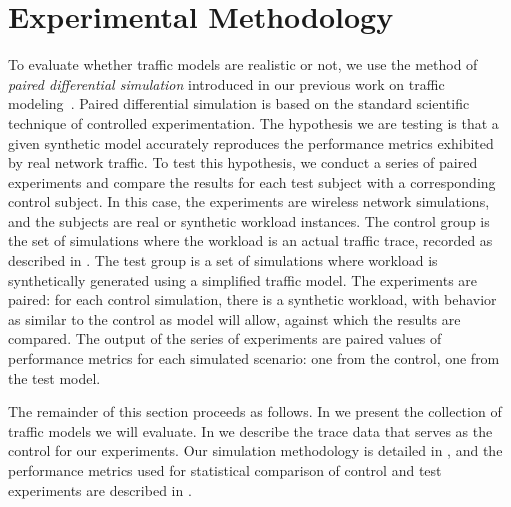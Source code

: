 \documentclass[twocolumn,final]{svjour3}
\begin{document}



\section{Experimental Methodology}
\label{sec:methodology}

To evaluate whether traffic models are realistic or not, we use the method of \textit{paired differential simulation} introduced in our previous work on traffic modeling~\cite{Karpinski07:realism,Karpinski07:cbr-failure}. %
%
%
Paired differential simulation is based on the standard scientific technique of controlled experimentation. 
The hypothesis we are testing is that a given synthetic model accurately reproduces the performance metrics exhibited by real network traffic. To test this hypothesis, we conduct a series of paired experiments and compare the results for each test subject with a corresponding control subject. In this case, the experiments are wireless network simulations, and the subjects are real or synthetic workload instances. The control group is the set of simulations where the workload is an actual traffic trace, recorded as described in . The test group is a set of simulations where workload is synthetically generated using a simplified traffic model. The experiments are paired: for each control simulation, there is a synthetic workload, with behavior as similar to the control as model will allow, against which the results are compared. The output of the series of experiments are paired values of performance metrics for each simulated scenario: one from the control, one from the test model.

The remainder of this section proceeds as follows. In  we present the collection of traffic models we will evaluate. In  we describe the trace data that serves as the control for our experiments. Our simulation methodology is detailed in , and the performance metrics used for statistical comparison of control and test experiments are described in .
\end{document}
